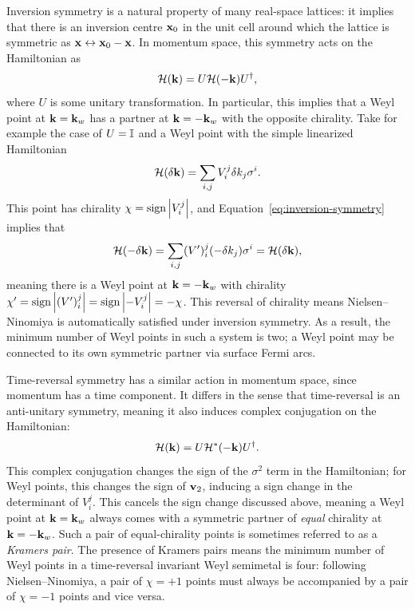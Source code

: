 Inversion symmetry is a natural property of many real-space lattices: it implies that there is an inversion centre $\vb{x}_0$ in the unit cell around which the lattice is symmetric as $\vb{x}\leftrightarrow\vb{x}_0-\vb{x}$. In momentum space, this symmetry acts on the Hamiltonian as
\begin{equation}\label{eq:inversion-symmetry}
	\mathcal{H}(\vb{k}) = U\mathcal{H}(-\vb{k})U^\dag,
\end{equation}
where $U$ is some unitary transformation. In particular, this implies that a Weyl point at $\vb{k}=\vb{k}_w$ has a partner at $\vb{k}=-\vb{k}_w$ with the opposite chirality. Take for example the case of $U=\mathbb{I}$ and a Weyl point with the simple linearized Hamiltonian 
\begin{equation*}
	\mathcal{H}(\delta\vb{k}) = \sum_{i,j}V_i^j\delta k_j \sigma^i.
\end{equation*}
This point has chirality $\chi = \operatorname{sign}\abs{V_i^j}$, and Equation~\eqref{eq:inversion-symmetry} implies that
\begin{equation*}
	\mathcal{H}(-\delta\vb{k}) = \sum_{i,j}(V')_i^j(-\delta k_j)\sigma^i = \mathcal{H}(\delta\vb{k}),
\end{equation*}
meaning there is a Weyl point at $\vb{k}=-\vb{k}_w$ with chirality $\chi' = \operatorname{sign}\abs{(V')_i^j} = \operatorname{sign}\abs{-V_i^j} = -\chi$. This reversal of chirality means Nielsen--Ninomiya is automatically satisfied under inversion symmetry. As a result, the minimum number of Weyl points in such a system is two; a Weyl point may be connected to its own symmetric partner via surface Fermi arcs.

Time-reversal symmetry has a similar action in momentum space, since momentum has a time component. It differs in the sense that time-reversal is an anti-unitary symmetry, meaning it also induces complex conjugation on the Hamiltonian:
\begin{equation*}
	\mathcal{H}(\vb{k}) = U\mathcal{H}^*(-\vb{k})U^\dag.
\end{equation*}
This complex conjugation changes the sign of the $\sigma^2$ term in the Hamiltonian; for Weyl points, this changes the sign of $\vb{v}_2$, inducing a sign change in the determinant of $V_i^j$. This cancels the sign change discussed above, meaning a Weyl point at $\vb{k}=\vb{k}_w$ always comes with a symmetric partner of \emph{equal} chirality at $\vb{k}=-\vb{k}_w$. Such a pair of equal-chirality points is sometimes referred to as a \emph{Kramers pair}. The presence of Kramers pairs means the minimum number of Weyl points in a time-reversal invariant Weyl semimetal is four: following Nielsen--Ninomiya, a pair of $\chi = +1$ points must always be accompanied by a pair of $\chi=-1$ points and vice versa.


